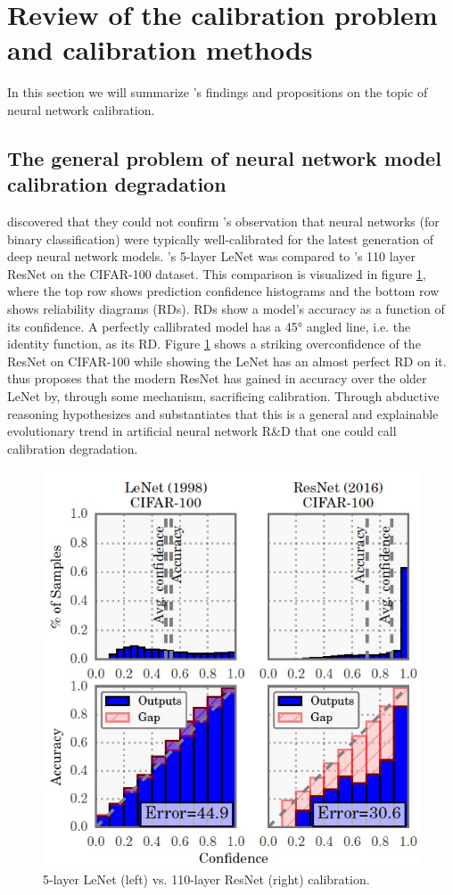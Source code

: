 \section{Review of the calibration problem and calibration methods}
In this section we will summarize \cite{guo2017calibration}'s findings and propositions on the topic of neural network calibration.

\subsection{The general problem of neural network model calibration degradation}
\cite{guo2017calibration} discovered that they could not confirm \cite{niculescu2005predicting}'s observation that neural networks (for binary classification) were typically well-calibrated for the latest generation of deep neural network models. \cite{lecun1998gradient}'s 5-layer LeNet was compared to \cite{he2016deep}'s 110 layer ResNet on the CIFAR-100 dataset. This comparison is visualized in figure \ref{fig:lenet_vs_resnet_calibration_guo_et_al}, where the top row shows prediction confidence histograms and the bottom row shows reliability diagrams (RDs). RDs show a model's accuracy as a function of its confidence. A perfectly callibrated model has a 45° angled line, i.e. the identity function, as its RD. Figure \ref{fig:lenet_vs_resnet_calibration_guo_et_al} shows a striking overconfidence of the ResNet on CIFAR-100 while showing the LeNet has an almost perfect RD on it. \cite{guo2017calibration} thus proposes that the modern ResNet has gained in accuracy over the older LeNet by, through some mechanism, sacrificing calibration. Through abductive reasoning \cite{guo2017calibration} hypothesizes and substantiates that this is a general and explainable evolutionary trend in artificial neural network R\&D that one could call calibration degradation. 

\begin{figure}[htbp!]
  \centering
  \includegraphics[width=0.6\linewidth]{images/lenet_vs_resnet_calibration_guo_et_al.jpg}
  \caption[5-layer LeNet's vs. 110-layer ResNet's calibration.]{5-layer LeNet (left) vs. 110-layer ResNet (right) calibration.}
  \label{fig:lenet_vs_resnet_calibration_guo_et_al}
\end{figure}
\newpage

